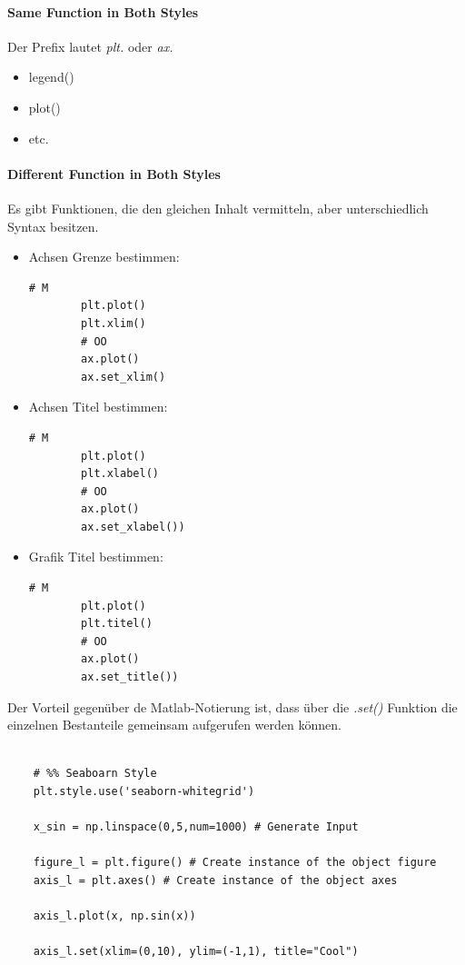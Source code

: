 \paragraph{Same Function in Both Styles}
Der Prefix lautet \textit{plt.} oder \textit{ax.}
\begin{itemize}
	\item legend()
	\item plot()
	\item etc.
\end{itemize}

\paragraph{Different Function in Both Styles}
Es gibt Funktionen, die den gleichen Inhalt vermitteln, aber unterschiedlich Syntax besitzen.
\begin{itemize}
	\item Achsen Grenze bestimmen:
	\begin{lstlisting}[style=python]
		# M
		plt.plot()
		plt.xlim()
		# OO
		ax.plot()
		ax.set_xlim()
	\end{lstlisting}
	\item Achsen Titel bestimmen:
	\begin{lstlisting}[style=python]
		# M
		plt.plot()
		plt.xlabel()
		# OO
		ax.plot()
		ax.set_xlabel())
	\end{lstlisting}
	\item Grafik Titel bestimmen:
	\begin{lstlisting}[style=python]
		# M
		plt.plot()
		plt.titel()
		# OO
		ax.plot()
		ax.set_title())
	\end{lstlisting}
\end{itemize}
Der Vorteil gegenüber de Matlab-Notierung ist, dass über die \textit{.set()} Funktion die einzelnen Bestanteile gemeinsam aufgerufen werden können.
\begin{lstlisting}[style=python]
	
	# %% Seaboarn Style
	plt.style.use('seaborn-whitegrid')
	
	x_sin = np.linspace(0,5,num=1000) # Generate Input
	
	figure_l = plt.figure() # Create instance of the object figure
	axis_l = plt.axes() # Create instance of the object axes
	
	axis_l.plot(x, np.sin(x))
	
	axis_l.set(xlim=(0,10), ylim=(-1,1), title="Cool")
\end{lstlisting}

